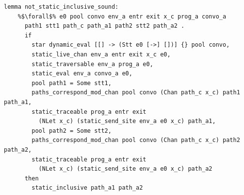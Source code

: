 \documentclass{article}
\begin{document}
\begin{lstlisting}[language=logic, escapechar=\%]
  lemma not_static_inclusive_sound:
    %$\forall$% e0 pool convo env_a entr exit x_c prog_a convo_a
      path1 stt1 path_c path_a1 path2 stt2 path_a2 .
      if
        star dynamic_eval [[] -> (Stt e0 [->] [])] {} pool convo, 
        static_live_chan env_a entr exit x_c e0, 
        static_traversable env_a prog_a e0, 
        static_eval env_a convo_a e0, 
        pool path1 = Some stt1, 
        paths_correspond_mod_chan pool convo (Chan path_c x_c) path1 path_a1, 
        static_traceable prog_a entr exit
          (NLet x_c) (static_send_site env_a e0 x_c) path_a1, 
        pool path2 = Some stt2, 
        paths_correspond_mod_chan pool convo (Chan path_c x_c) path2 path_a2, 
        static_traceable prog_a entr exit
          (NLet x_c) (static_send_site env_a e0 x_c) path_a2
      then
        static_inclusive path_a1 path_a2
  \end{lstlisting}

  
\end{document}
